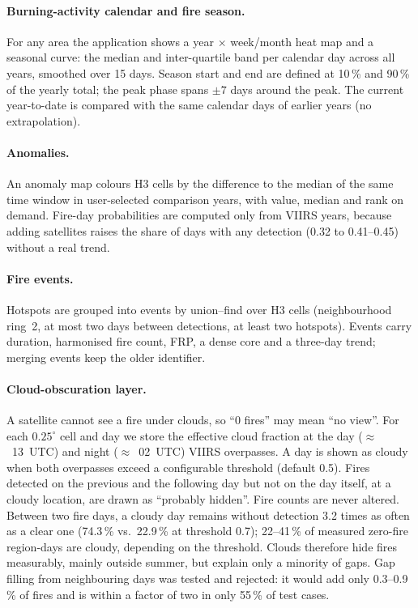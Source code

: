 \documentclass[11pt,a4paper]{article}
\begin{document}
\paragraph{Burning-activity calendar and fire season.}
For any area the application shows a year $\times$ week/month heat map and a seasonal curve: the median
and inter-quartile band per calendar day across all years, smoothed over 15 days. Season start and end
are defined at 10\,\% and 90\,\% of the yearly total; the peak phase spans $\pm 7$ days around the peak.
The current year-to-date is compared with the same calendar days of earlier years (no extrapolation).

\paragraph{Anomalies.}
An anomaly map colours H3 cells by the difference to the median of the same time window in user-selected
comparison years, with value, median and rank on demand. Fire-day probabilities are computed only from
VIIRS years, because adding satellites raises the share of days with any detection (0.32 to 0.41--0.45)
without a real trend.

\paragraph{Fire events.}
Hotspots are grouped into events by union--find over H3 cells (neighbourhood ring~2, at most two days
between detections, at least two hotspots). Events carry duration, harmonised fire count, FRP, a dense core
and a three-day trend; merging events keep the older identifier.

\paragraph{Cloud-obscuration layer.}
A satellite cannot see a fire under clouds, so ``0 fires'' may mean ``no view''. For each $0.25^\circ$ cell
and day we store the effective cloud fraction at the day ($\approx$~13~UTC) and night ($\approx$~02~UTC)
VIIRS overpasses. A day is shown as cloudy when both overpasses exceed a configurable threshold (default
0.5). Fires detected on the previous and the following day but not on the day itself, at a cloudy location,
are drawn as ``probably hidden''. Fire counts are never altered. Between two fire days, a cloudy day remains
without detection 3.2 times as often as a clear one (74.3\,\% vs.\ 22.9\,\% at threshold 0.7); 22--41\,\%
of measured zero-fire region-days are cloudy, depending on the threshold. Clouds therefore hide fires
measurably, mainly outside summer, but explain only a minority of gaps. Gap filling from neighbouring days
was tested and rejected: it would add only 0.3--0.9\,\% of fires and is within a factor of two in only
55\,\% of test cases.
\end{document}
